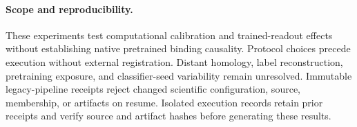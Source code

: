 \paragraph{Scope and reproducibility.}

These experiments test computational calibration and trained-readout effects without establishing native pretrained binding causality. Protocol choices precede execution without external registration. Distant homology, label reconstruction, pretraining exposure, and classifier-seed variability remain unresolved. Immutable legacy-pipeline receipts reject changed scientific configuration, source, membership, or artifacts on resume. Isolated execution records retain prior receipts and verify source and artifact hashes before generating these results.
